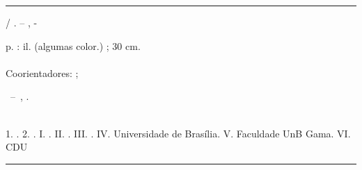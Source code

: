 \begin{fichacatalografica}
	\vspace*{\fill}					%
	\hrule							%
	\begin{center}					%
	\begin{minipage}[c]{12.5cm}		%
	
	\autorficha
	
	\hspace{0.5cm} \imprimirtitulo  / \autoresficha. --
	\imprimirlocal, \imprimirdata-
	
	\hspace{0.5cm} \pageref*{LastPage} p. : il. (algumas color.) ; 30 cm.\\
	
	\hspace{0.5cm} \imprimirorientadorRotulo~\imprimirorientador\\

	\hspace{0.5cm} Coorientadores: \coorientadorUm; \coorientadorDois\\

	\hspace{0.5cm}
	\parbox[t]{\dimexpr\linewidth-0.8cm\relax}{\imprimirtipotrabalho~--~\imprimirinstituicao,
	\imprimirdata.}\\

	\hspace{0.5cm}
		1. \imprimirpalavrachaveum.
		2. \imprimirpalavrachavedois.
		I. \orientadorficha.
		II. \coorientadorUmficha.
		III. \coorientadorDoisficha.
		IV. Universidade de Brasília.
		V. Faculdade UnB Gama.
		VI. \imprimirtitulo\\
	
	\hspace{8.75cm} CDU \nomecdu\\
	
	\end{minipage}
	\end{center}
	\hrule
\end{fichacatalografica}
